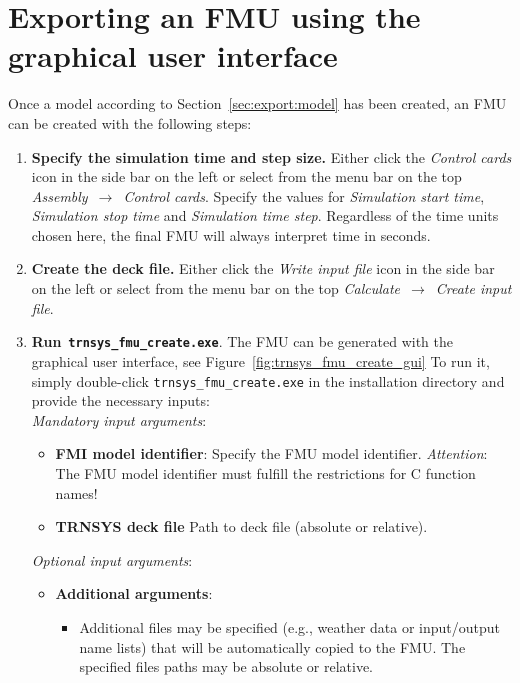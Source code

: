 \clearpage

\section{Exporting an FMU using the graphical user interface}
\label{sec:export:gui}

Once a \trnsys model according to Section~\ref{sec:export:model} has been created, an FMU can be created with the following steps:
\begin{enumerate}
  \item \textbf{Specify the simulation time and step size.} Either click the \textit{Control cards} icon in the side bar on the left or select from the menu bar on the top \textit{Assembly}~$\rightarrow$~\textit{Control cards}. 
  Specify the values for \textit{Simulation start time}, \textit{Simulation stop time} and \textit{Simulation time step}.
  Regardless of the time units chosen here, the final FMU will always interpret time in seconds.
  \item \textbf{Create the deck file.} Either click the \textit{Write input file} icon in the side bar on the left or select from the menu bar on the top \textit{Calculate}~$\rightarrow$~\textit{Create input file}.
  \item \textbf{Run}~\textbf{\texttt{trnsys\_fmu\_create.exe}}.
  The FMU can be generated with the graphical user interface, see Figure~\ref{fig:trnsys_fmu_create_gui}
  To run it, simply double-click \texttt{trnsys\_fmu\_create.exe} in the installation directory and provide the necessary inputs:\\
  \textit{Mandatory input arguments}:
  \begin{itemize}
    \item \textbf{FMI model identifier}: Specify the FMU model identifier. 
    \emph{Attention}: The FMU model identifier must fulfill the restrictions for C function names!
    \item \textbf{TRNSYS deck file} Path to \trnsys deck file (absolute or relative).
  \end{itemize}
  \textit{Optional input arguments}:
  \begin{itemize}
    \item \textbf{Additional arguments}:
    \begin{itemize}
      \item Additional files may be specified (e.g., weather data or input/output name lists) that will be automatically copied to the FMU. The specified files paths may be absolute or relative.

\end{itemize}
\end{itemize}
\end{enumerate}
